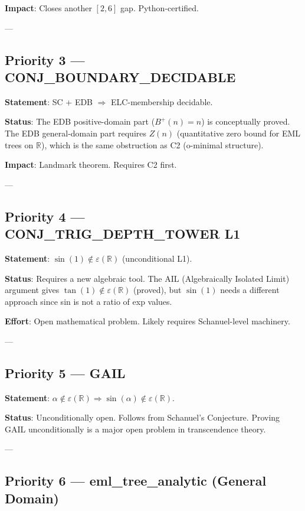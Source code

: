 \documentclass[12pt]{article}
\theoremstyle{definition}
\begin{document}
\textbf{Impact}: Closes another $[2,6]$ gap. Python-certified.

---

\subsection{Priority 3 — CONJ\_BOUNDARY\_DECIDABLE}

\textbf{Statement}: SC + EDB $\Rightarrow$ ELC-membership decidable.

\textbf{Status}: The EDB positive-domain part ($B^+(n) = n$) is conceptually proved.
The EDB general-domain part requires $Z(n)$ (quantitative zero bound for EML trees on $\mathbb{R}$),
which is the same obstruction as C2 (o-minimal structure).

\textbf{Impact}: Landmark theorem. Requires C2 first.

---

\subsection{Priority 4 — CONJ\_TRIG\_DEPTH\_TOWER L1}

\textbf{Statement}: $\sin(1) \notin \varepsilon(\mathbb{R})$ (unconditional L1).

\textbf{Status}: Requires a new algebraic tool. The AIL (Algebraically Isolated Limit)
argument gives $\tan(1) \notin \varepsilon(\mathbb{R})$ (proved), but $\sin(1)$ needs a
different approach since sin is not a ratio of exp values.

\textbf{Effort}: Open mathematical problem. Likely requires Schanuel-level machinery.

---

\subsection{Priority 5 — GAIL}

\textbf{Statement}: $\alpha \notin \varepsilon(\mathbb{R}) \Rightarrow \sin(\alpha) \notin \varepsilon(\mathbb{R})$.

\textbf{Status}: Unconditionally open. Follows from Schanuel's Conjecture.
Proving GAIL unconditionally is a major open problem in transcendence theory.

---

\subsection{Priority 6 — eml\_tree\_analytic (General Domain)}
\end{document}
